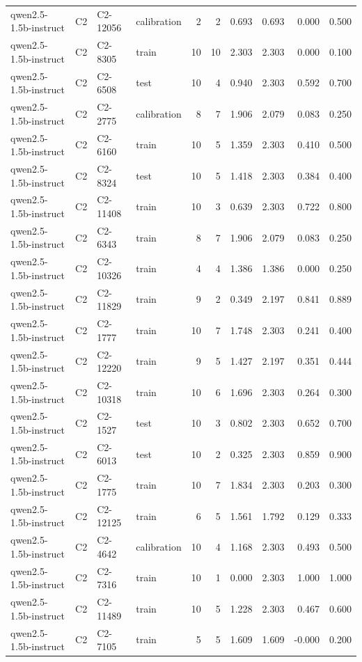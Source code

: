 \begin{table}
\begin{tabular}{llllrrrrrr}
qwen2.5-1.5b-instruct & C2 & C2-12056 & calibration & 2 & 2 & 0.693 & 0.693 & 0.000 & 0.500 \\
qwen2.5-1.5b-instruct & C2 & C2-8305 & train & 10 & 10 & 2.303 & 2.303 & 0.000 & 0.100 \\
qwen2.5-1.5b-instruct & C2 & C2-6508 & test & 10 & 4 & 0.940 & 2.303 & 0.592 & 0.700 \\
qwen2.5-1.5b-instruct & C2 & C2-2775 & calibration & 8 & 7 & 1.906 & 2.079 & 0.083 & 0.250 \\
qwen2.5-1.5b-instruct & C2 & C2-6160 & train & 10 & 5 & 1.359 & 2.303 & 0.410 & 0.500 \\
qwen2.5-1.5b-instruct & C2 & C2-8324 & test & 10 & 5 & 1.418 & 2.303 & 0.384 & 0.400 \\
qwen2.5-1.5b-instruct & C2 & C2-11408 & train & 10 & 3 & 0.639 & 2.303 & 0.722 & 0.800 \\
qwen2.5-1.5b-instruct & C2 & C2-6343 & train & 8 & 7 & 1.906 & 2.079 & 0.083 & 0.250 \\
qwen2.5-1.5b-instruct & C2 & C2-10326 & train & 4 & 4 & 1.386 & 1.386 & 0.000 & 0.250 \\
qwen2.5-1.5b-instruct & C2 & C2-11829 & train & 9 & 2 & 0.349 & 2.197 & 0.841 & 0.889 \\
qwen2.5-1.5b-instruct & C2 & C2-1777 & train & 10 & 7 & 1.748 & 2.303 & 0.241 & 0.400 \\
qwen2.5-1.5b-instruct & C2 & C2-12220 & train & 9 & 5 & 1.427 & 2.197 & 0.351 & 0.444 \\
qwen2.5-1.5b-instruct & C2 & C2-10318 & train & 10 & 6 & 1.696 & 2.303 & 0.264 & 0.300 \\
qwen2.5-1.5b-instruct & C2 & C2-1527 & test & 10 & 3 & 0.802 & 2.303 & 0.652 & 0.700 \\
qwen2.5-1.5b-instruct & C2 & C2-6013 & test & 10 & 2 & 0.325 & 2.303 & 0.859 & 0.900 \\
qwen2.5-1.5b-instruct & C2 & C2-1775 & train & 10 & 7 & 1.834 & 2.303 & 0.203 & 0.300 \\
qwen2.5-1.5b-instruct & C2 & C2-12125 & train & 6 & 5 & 1.561 & 1.792 & 0.129 & 0.333 \\
qwen2.5-1.5b-instruct & C2 & C2-4642 & calibration & 10 & 4 & 1.168 & 2.303 & 0.493 & 0.500 \\
qwen2.5-1.5b-instruct & C2 & C2-7316 & train & 10 & 1 & 0.000 & 2.303 & 1.000 & 1.000 \\
qwen2.5-1.5b-instruct & C2 & C2-11489 & train & 10 & 5 & 1.228 & 2.303 & 0.467 & 0.600 \\
qwen2.5-1.5b-instruct & C2 & C2-7105 & train & 5 & 5 & 1.609 & 1.609 & -0.000 & 0.200 \\

\end{tabular}
\end{table}
